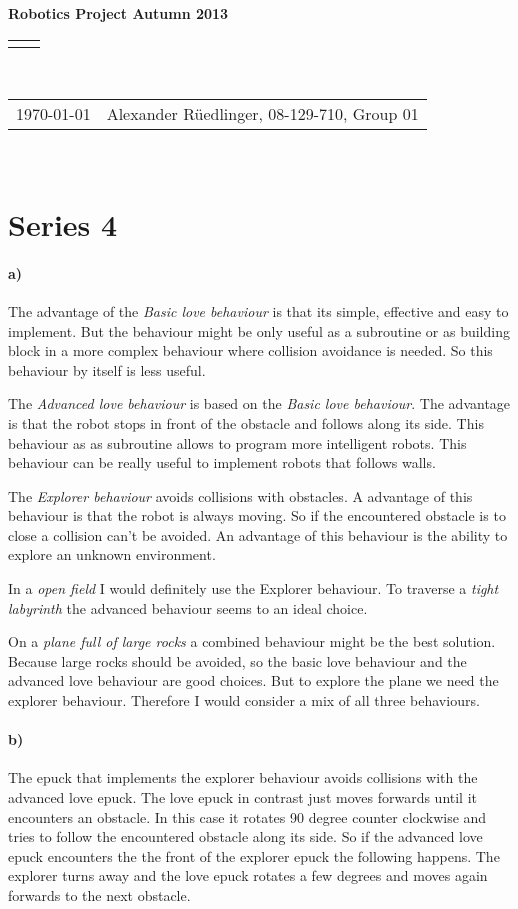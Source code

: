 \documentclass[12pt]{article}
\renewcommand{\title}[1]{\textbf{#1}\\}
\renewcommand{\line}{\begin{tabularx}{\textwidth}{X>{\raggedleft}X}\hline\\\end{tabularx}\\[-0.5cm]}
\newcommand{\leftright}[2]{\begin{tabularx}{\textwidth}{X>{\raggedleft}X}#1%
& #2\\\end{tabularx}\\[-0.5cm]}
\begin{document}
\title{Robotics Project  Autumn 2013}
\line
\leftright{\today}{Alexander Rüedlinger, 08-129-710, Group 01} %
\section*{Series 4}

\paragraph{a)}
The advantage of the \emph{Basic love behaviour} is that its simple, effective and easy to implement.
But the behaviour might be only useful as a subroutine or as building block in a more complex behaviour where collision avoidance is needed. So this behaviour by itself is less useful.

The \emph{Advanced love behaviour} is based on the \emph{Basic love behaviour}. The advantage is that the robot stops in front of the obstacle and follows along its side. This behaviour as as subroutine allows to program more intelligent robots. This behaviour can be really useful to implement robots that follows walls.

The \emph{Explorer behaviour} avoids collisions with obstacles. A advantage of this behaviour is that the robot is always moving. So if the encountered obstacle is to close a collision can't be avoided. An advantage of this behaviour is the ability to explore an unknown environment.

In a \emph{open field} I would definitely use the Explorer behaviour. To traverse a \emph{tight labyrinth} the advanced behaviour seems to an ideal choice.

On a \emph{plane full of large rocks} a combined behaviour might be the best solution. Because large rocks should be avoided, so the basic love behaviour and the advanced love behaviour are good choices. But to explore the plane we need the explorer behaviour. Therefore I would consider a mix of all three behaviours.

\paragraph{b)}
The epuck that implements the explorer behaviour avoids collisions with the advanced love epuck. The love epuck in contrast just moves forwards until it encounters an obstacle. In this case it rotates 90 degree counter clockwise and tries to follow the encountered obstacle along its side. So if the advanced love epuck encounters the the front of the explorer epuck the following happens. The explorer turns away and the love epuck rotates a few degrees and moves again forwards to the next obstacle.
\end{document}
